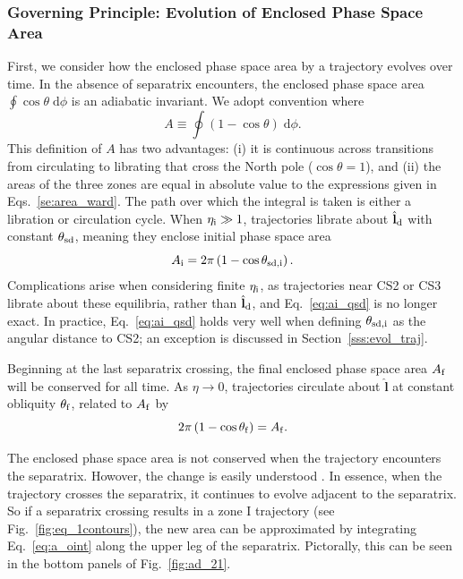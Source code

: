 \documentclass[
        fleqn,
        usenatbib,
    ]{mnras}
\newcommand*{\bm}[1]{\boldsymbol{\mathbf{#1}}}
\newcommand*{\uv}[1]{\hat{\bm{#1}}}
\newcommand*{\p}[1]{\left(#1\right)}
\begin{document}
\subsubsection{Governing Principle: Evolution of Enclosed Phase Space
Area}\label{sss:a_evo}

First, we consider how the enclosed phase space area by a trajectory evolves
over time. In the absence of separatrix encounters, the enclosed phase space
area $\oint \cos\theta \;\mathrm{d}\phi$ is an adiabatic invariant. We adopt
convention where
\begin{equation}
    A \equiv \oint \p{1 - \cos \theta}\;\mathrm{d}\phi.\label{eq:a_oint}
\end{equation}
This definition of $A$ has two advantages: (i) it is continuous across
transitions from circulating to librating that cross the North pole ($\cos
\theta = 1$), and (ii) the areas of the three zones are equal in absolute value
to the expressions given in Eqs.~\eqref{se:area_ward}. The path over which the
integral is taken is either a libration or circulation cycle. When $\eta_{\rm i}
\gg 1$, trajectories librate about $\uv{l}_{\rm d}$ with constant $\theta_{\rm
sd}$, meaning they enclose initial phase space area
\begin{equation}
    A_{\rm i} = 2\pi\p{1 - \cos \theta_{\rm sd, i}}.\label{eq:ai_qsd}
\end{equation}
Complications arise when considering finite $\eta_{\rm i}$, as trajectories near
CS2 or CS3 librate about these equilibria, rather than $\uv{l}_{\rm d}$, and
Eq.~\eqref{eq:ai_qsd} is no longer exact. In practice, Eq.~\eqref{eq:ai_qsd}
holds very well when defining $\theta_{\rm sd, i}$ as the angular distance to
CS2; an exception is discussed in Section~\ref{sss:evol_traj}.

Beginning at the last separatrix crossing, the final enclosed phase space area
$A_{\rm f}$ will be conserved for all time. As $\eta \to 0$, trajectories
circulate about $\uv{l}$ at constant obliquity $\theta_{\rm f}$, related to
$A_{\rm f}$ by
\begin{equation}
    2\pi\p{1 - \cos \theta_{\rm f}} = A_{\rm f}. \label{eq:qfaf}
\end{equation}

The enclosed phase space area is not conserved when the trajectory encounters
the separatrix. Howover, the change is easily understood \citep{henrard1982}. In
essence, when the trajectory crosses the separatrix, it continues to evolve
adjacent to the separatrix. So if a separatrix crossing results in a zone I
trajectory (see Fig.~\ref{fig:eq_1contours}), the new area can be approximated
by integrating Eq.~\eqref{eq:a_oint} along the upper leg of the separatrix.
Pictorally, this can be seen in the bottom panels of Fig.~\ref{fig:ad_21}.
\end{document}
